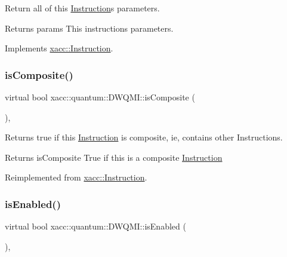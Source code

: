 Return all of this \hyperlink{a01155}{Instruction}\textquotesingle{}s parameters.

\begin{DoxyReturn}{Returns}
params This instructions parameters. 
\end{DoxyReturn}


Implements \hyperlink{a01155_aeb67c67713896e8f27a5c7dd531f3340}{xacc\+::\+Instruction}.

\mbox{\label{a00987_ad2b3b4ee72dee48150bf78d92c52e5e0}} 
\subsubsection{\texorpdfstring{is\+Composite()}{isComposite()}}
{\footnotesize\ttfamily virtual bool xacc\+::quantum\+::\+D\+W\+Q\+M\+I\+::is\+Composite (\begin{DoxyParamCaption}{ }\end{DoxyParamCaption})\hspace{0.3cm}{\ttfamily [inline]}, {\ttfamily [virtual]}}

Returns true if this \hyperlink{a01155}{Instruction} is composite, ie, contains other Instructions.

\begin{DoxyReturn}{Returns}
is\+Composite True if this is a composite \hyperlink{a01155}{Instruction} 
\end{DoxyReturn}


Reimplemented from \hyperlink{a01155_a4383f1036d0fcfe890ab9c613dbd5f38}{xacc\+::\+Instruction}.

\mbox{\label{a00987_aea76901b30d85172ef26fc317b4c0ed7}} 
\subsubsection{\texorpdfstring{is\+Enabled()}{isEnabled()}}
{\footnotesize\ttfamily virtual bool xacc\+::quantum\+::\+D\+W\+Q\+M\+I\+::is\+Enabled (\begin{DoxyParamCaption}{ }\end{DoxyParamCaption})\hspace{0.3cm}{\ttfamily [inline]}, {\ttfamily [virtual]}}

